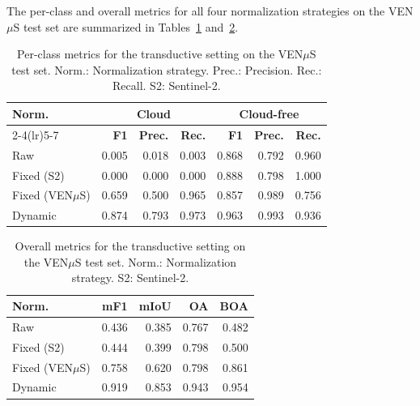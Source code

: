 The per-class and overall metrics for all four normalization strategies on the VEN$\mu$S test set are summarized in Tables~\ref{tab:e0_perclass} and~\ref{tab:e0_overall}.

\begin{table}[H]
\centering
\caption[Per-class metrics for the transductive setting on the VEN$\mu$S test set.]{Per-class metrics for the transductive setting on the VEN$\mu$S test set. Norm.: Normalization strategy. Prec.: Precision. Rec.: Recall. S2: Sentinel-2.}
\label{tab:e0_perclass}
\small
\begin{tabular}{lrrrrrr}
\toprule
\multirow{2}{*}{\textbf{Norm.}} & 
\multicolumn{3}{c}{\textbf{Cloud}} & 
\multicolumn{3}{c}{\textbf{Cloud-free}} \\
\cmidrule(lr){2-4}\cmidrule(lr){5-7}
& \textbf{F1} & \textbf{Prec.} & \textbf{Rec.} & 
\textbf{F1} & \textbf{Prec.} & \textbf{Rec.} \\
\midrule
Raw               & 0.005 & 0.018 & 0.003 & 0.868 & 0.792 & 0.960 \\
Fixed (S2)        & 0.000 & 0.000 & 0.000 & 0.888 & 0.798 & 1.000 \\
Fixed (VEN$\mu$S) & 0.659 & 0.500 & 0.965 & 0.857 & 0.989 & 0.756 \\
Dynamic           & 0.874 & 0.793 & 0.973 & 0.963 & 0.993 & 0.936 \\
\bottomrule
\end{tabular}
\end{table}

\begin{table}[H]
\centering
\caption[Overall metrics for the transductive setting on the VEN$\mu$S 
test set.]{Overall metrics for the transductive setting on the VEN$\mu$S 
test set. Norm.: Normalization strategy. S2: Sentinel-2.}
\label{tab:e0_overall}
\small
\begin{tabular}{lrrrr}
\toprule
\textbf{Norm.} & \textbf{mF1} & \textbf{mIoU} & 
\textbf{OA} & \textbf{BOA} \\
\midrule
Raw               & 0.436 & 0.385 & 0.767 & 0.482 \\
Fixed (S2)        & 0.444 & 0.399 & 0.798 & 0.500 \\
Fixed (VEN$\mu$S) & 0.758 & 0.620 & 0.798 & 0.861 \\
Dynamic           & 0.919 & 0.853 & 0.943 & 0.954 \\
\bottomrule
\end{tabular}
\end{table}

